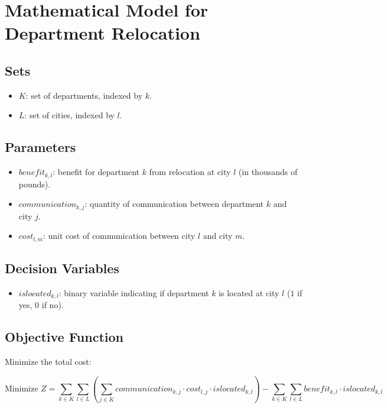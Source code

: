 \documentclass{article}
\begin{document}
\section*{Mathematical Model for Department Relocation}

\subsection*{Sets}
\begin{itemize}
    \item $K$: set of departments, indexed by $k$.
    \item $L$: set of cities, indexed by $l$.
\end{itemize}

\subsection*{Parameters}
\begin{itemize}
    \item $benefit_{k, l}$: benefit for department $k$ from relocation at city $l$ (in thousands of pounds).
    \item $communication_{k, j}$: quantity of communication between department $k$ and city $j$.
    \item $cost_{l, m}$: unit cost of communication between city $l$ and city $m$.
\end{itemize}

\subsection*{Decision Variables}
\begin{itemize}
    \item $islocated_{k, l}$: binary variable indicating if department $k$ is located at city $l$ ($1$ if yes, $0$ if no).
\end{itemize}

\subsection*{Objective Function}
Minimize the total cost:

\[
\text{Minimize } Z = \sum_{k \in K} \sum_{l \in L} \left( \sum_{j \in K} communication_{k, j} \cdot cost_{l, j} \cdot islocated_{k, l} \right) - \sum_{k \in K} \sum_{l \in L} benefit_{k, l} \cdot islocated_{k, l}
\]
\end{document}
